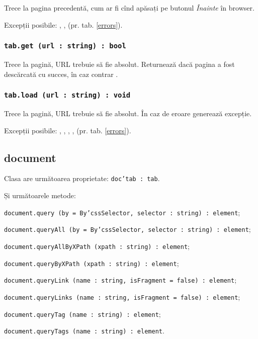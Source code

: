 Trece la pagina precedentă, cum ar fi cînd apăsați pe butonul \textit{Înainte} în browser.


Excepții posibile: , ,  (pr. tab. \ref{errors}).

\subsubsection{\texttt{tab.get (url : string) : bool}}

Trece la pagină, URL trebuie să fie absolut. Returnează \true{} dacă pagina a fost descărcată cu succes, în caz contrar \false.

\subsubsection{\texttt{tab.load (url : string) : void}}

Trece la pagină, URL trebuie să fie absolut. În caz de eroare generează excepție.

Excepții posibile: , , , ,  (pr. tab. \ref{errors}).

\subsection{document}

Clasa \dom{} are următoarea proprietate: \texttt{doc'tab : tab}.

Și următoarele metode:
\begin{icItems}
	\item \texttt{document.query (by = By'cssSelector, selector : string) : element};
	\item \texttt{document.queryAll (by = By'cssSelector, selector : string) : element};
	\item \texttt{document.queryAllByXPath (xpath : string) : element};
	\item \texttt{document.queryByXPath (xpath : string) : element};
	\item \texttt{document.queryLink (name : string, isFragment = false) : element};
	\item \texttt{document.queryLinks (name : string, isFragment = false) : element};
	\item \texttt{document.queryTag (name : string) : element};
	\item \texttt{document.queryTags (name : string) : element}.
\end{icItems}


